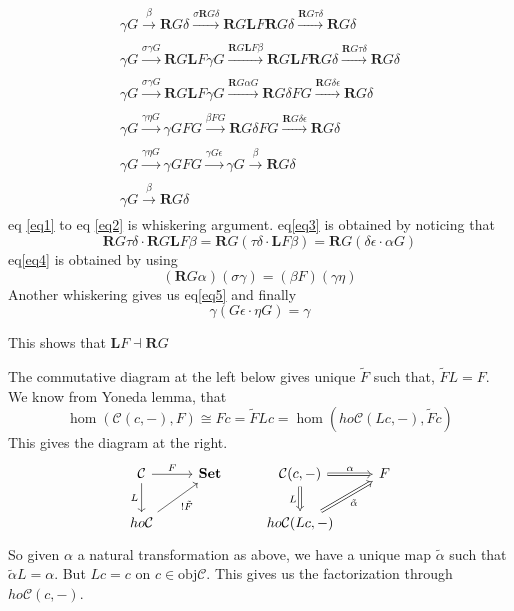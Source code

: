 \documentclass[name=Narendran, andrewid=narendran, course=eCHT, num=1]{homework}
\newcommand{\lf}{\bm{L}F}
\newcommand{\rg}{\bm{R}G}
\begin{document}
\begin{eqnarray}
    \gamma G \xrightarrow[ ]{\beta }\rg\delta \xrightarrow[ ]{\sigma \rg \delta }\rg\lf\rg\delta \xrightarrow[ ]{\rg\tau \delta }\rg\delta \label{eq1}\\
 \gamma G \xrightarrow[ ]{\sigma \gamma G }\rg\lf \gamma G     \xrightarrow[ ]{\rg\lf\beta }\rg\lf\rg\delta \xrightarrow[ ]{\rg\tau \delta }\rg\delta\label{eq2}\\
 \gamma G \xrightarrow[ ]{\sigma \gamma G }\rg\lf\gamma G   \xrightarrow[ ]{\rg\alpha G }\rg\delta FG \xrightarrow[ ]{\rg\delta \epsilon }\rg \delta \label{eq3}\\
 \gamma G \xrightarrow[ ]{\gamma \eta G }\gamma G FG \xrightarrow[ ]{\beta FG }\rg\delta FG \xrightarrow[ ]{\rg\delta \epsilon }\rg \delta\label{eq4} \\
 \gamma G \xrightarrow[ ]{\gamma \eta G }\gamma GFG \xrightarrow[ ]{\gamma G \epsilon} \gamma G \xrightarrow[ ]{\beta } \rg\delta \label{eq5}\\
 \gamma G\xrightarrow[ ]{\beta }\rg\delta\label{eq6}
\end{eqnarray}
eq \ref{eq1} to eq \ref{eq2} is whiskering argument. eq\ref{eq3} is obtained by noticing that $$\rg\tau \delta \cdot \rg\lf\beta=\rg(\tau\delta\cdot \lf\beta)=\rg(\delta\epsilon\cdot \alpha G)$$
eq\ref{eq4} is obtained by using 
\[
    (\rg\alpha)( \sigma\gamma)=(\beta F)( \gamma \eta )
\]Another whiskering gives us eq\ref{eq5} and finally 
\[
    \gamma(G\epsilon\cdot\eta G )=\gamma 
\]

This shows that $\lf \dashv \rg$
\separator
{}

The commutative diagram at the left below gives unique $\tilde{F }$ such that, $\tilde{F}L=F$. 
We know from Yoneda lemma, that 
\[
     \hom (\mathcal{C}(c,-), F)\cong Fc =\tilde{F }Lc= \hom(ho \mathcal{C}(Lc,-),\tilde{F }c)
\]
This gives the diagram at the right. 
\[
    \begin{tikzcd}
\mathcal{C} \arrow[r,"F"] \arrow[d, "L"'] & {\bf Set} & {\mathcal{C}(c,-)} \arrow[r, "\alpha", Rightarrow] \arrow[d, "L"', Rightarrow] & F \\
ho\mathcal{C} \arrow[ru,"!\tilde{F}"']              &           & {ho \mathcal{C}(Lc,-)} \arrow[ru, "\tilde{\alpha}"', Rightarrow]                         &  
\end{tikzcd}
\]
So given $\alpha $ a natural transformation as above, we have a unique map $\tilde{\alpha }$ such that $\tilde{\alpha }L=\alpha$. But $Lc=c$ on $c\in \mathrm{obj } \mathcal{C}$. This gives us the factorization through $ho \mathcal{C}(c,-)$. 
\end{document}
